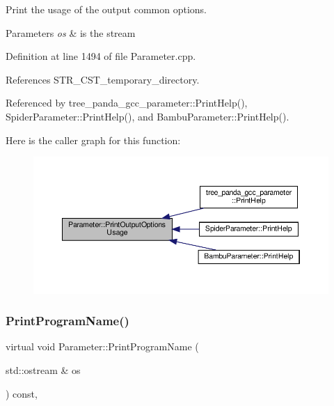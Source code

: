Print the usage of the output common options. 


\begin{DoxyParams}{Parameters}
{\em os} & is the stream \\
\hline
\end{DoxyParams}


Definition at line 1494 of file Parameter.\+cpp.



References S\+T\+R\+\_\+\+C\+S\+T\+\_\+temporary\+\_\+directory.



Referenced by tree\+\_\+panda\+\_\+gcc\+\_\+parameter\+::\+Print\+Help(), Spider\+Parameter\+::\+Print\+Help(), and Bambu\+Parameter\+::\+Print\+Help().

Here is the caller graph for this function\+:
\nopagebreak
\begin{figure}[H]
\begin{center}
\leavevmode
\includegraphics[width=350pt]{dc/dab/classParameter_a21a62c6800a84e42d12d8c29775d0e05_icgraph}
\end{center}
\end{figure}
\mbox{\label{classParameter_afe71fca464da99b2ff720d3ad15df051}} 
\subsubsection{\texorpdfstring{Print\+Program\+Name()}{PrintProgramName()}}
{\footnotesize\ttfamily virtual void Parameter\+::\+Print\+Program\+Name (\begin{DoxyParamCaption}\item[{std\+::ostream \&}]{os }\end{DoxyParamCaption}) const\hspace{0.3cm}{\ttfamily [protected]}, {}}



